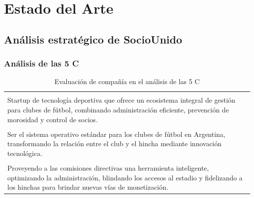 \section{Estado del Arte}

\subsection{Análisis estratégico de SocioUnido}

\subsubsection{Análisis de las 5 C}

\begin{table}[h!]
\centering
\renewcommand{\arraystretch}{1.5}
\begin{tabularx}{\textwidth}{|X|}
\hline
\rowcolor{blue!20} \multicolumn{1}{|c|}{\textbf{COMPAÑÍA}} \\ \hline
\rowcolor{blue!10} \multicolumn{1}{|c|}{\textbf{Descripción}} \\ \hline
Startup de tecnología deportiva que ofrece un ecosistema integral de gestión para clubes de fútbol, combinando administración eficiente, prevención de morosidad y control de socios. \\ \hline
\rowcolor{blue!10} \multicolumn{1}{|c|}{\textbf{Visión}} \\ \hline
Ser el sistema operativo estándar para los clubes de fútbol en Argentina, transformando la relación entre el club y el hincha mediante innovación tecnológica. \\ \hline
\rowcolor{blue!10} \multicolumn{1}{|c|}{\textbf{Misión}} \\ \hline
Proveyendo a las comisiones directivas una herramienta inteligente, optimizando la administración, blindando los accesos al estadio y fidelizando a los hinchas para brindar nuevas vías de monetización. \\ \hline
\end{tabularx}
\caption{Evaluación de compañía en el análisis de las 5 C}
\label{tab:tabla_compania}
\end{table}


